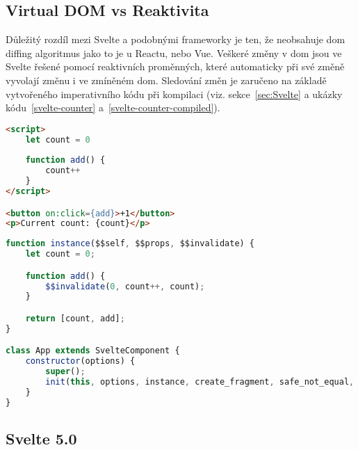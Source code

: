 \clearpage

\subsection{Virtual DOM vs Reaktivita}

Důležitý rozdíl mezi Svelte a podobnými frameworky je ten, že neobsahuje \gls{dom} diffing algoritmus jako to je u Reactu, nebo Vue.
Veškeré změny v \gls{dom} jsou ve Svelte řešené pomocí reaktivních proměnných, které automaticky při své změně vyvolají změnu i ve zmíněném \gls{dom}.
Sledování změn je zaručeno na základě vytvořeného imperativního kódu při kompilaci (viz. sekce~\ref{sec:Svelte} a ukázky kódu~\ref{svelte-counter} a~\ref{svelte-counter-compiled}).

\begin{lstlisting}[caption={Počítadlo ve Svelte}, label={svelte-counter}, language=html]
<script>
	let count = 0
	
	function add() {
		count++
	}
</script>

<button on:click={add}>+1</button>
<p>Current count: {count}</p>
\end{lstlisting}

\begin{lstlisting}[caption={Počítadlo po kompilaci}, label={svelte-counter-compiled}, language=JavaScript]
function instance($$self, $$props, $$invalidate) {
    let count = 0;

    function add() {
        $$invalidate(0, count++, count);
    }

    return [count, add];
}

class App extends SvelteComponent {
    constructor(options) {
        super();
        init(this, options, instance, create_fragment, safe_not_equal, {});
    }
}
\end{lstlisting}

\subsection{Svelte 5.0}
